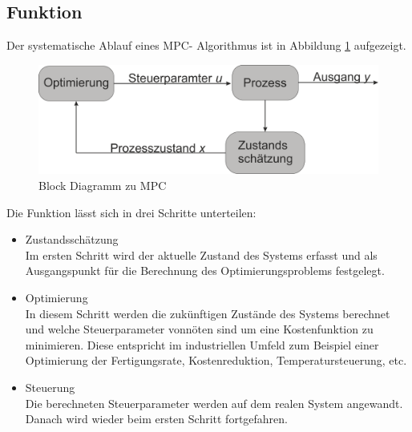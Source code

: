 \documentclass{like}
\begin{document}
\subsection*{Funktion}
Der systematische Ablauf eines \ac{MPC}- Algorithmus ist in Abbildung \ref{fig:mpcBlock} aufgezeigt.  

  \begin{figure}[ht!]
  	\centering
  	\includegraphics[width=350pt]{Abbildungen/mpcBlockDiagram.png}
  	\caption{Block Diagramm zu MPC}
  	\label{fig:mpcBlock}
  \end{figure}

Die Funktion lässt sich in drei Schritte unterteilen:
\begin{itemize}
	\item Zustandsschätzung \\ Im ersten Schritt wird der aktuelle Zustand des Systems erfasst und als Ausgangspunkt für die Berechnung des Optimierungsproblems festgelegt.
	\item Optimierung \\ In diesem Schritt werden die zukünftigen Zustände des Systems berechnet und welche Steuerparameter vonnöten sind um eine Kostenfunktion zu minimieren. Diese entspricht im industriellen Umfeld zum Beispiel einer Optimierung der Fertigungsrate, Kostenreduktion,  Temperatursteuerung, etc.
	\item Steuerung \\ Die berechneten Steuerparameter werden auf dem realen System angewandt. Danach wird wieder beim ersten Schritt fortgefahren.   
\end{itemize}
\end{document}
